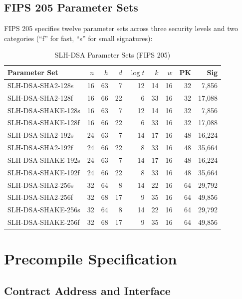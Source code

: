 \documentclass[11pt,a4paper]{article}
\begin{document}
\subsection{FIPS 205 Parameter Sets}

FIPS 205 specifies twelve parameter sets across three security levels and two categories (``f'' for fast, ``s'' for small signatures):

\begin{table}[htbp]
\centering
\caption{SLH-DSA Parameter Sets (FIPS 205)}
\label{tab:params}
\small
\begin{tabular}{@{}lrrrrrrrr@{}}
\toprule
Parameter Set & $n$ & $h$ & $d$ & $\log t$ & $k$ & $w$ & PK & Sig \\
\midrule
SLH-DSA-SHA2-128s & 16 & 63 & 7 & 12 & 14 & 16 & 32 & 7,856 \\
SLH-DSA-SHA2-128f & 16 & 66 & 22 & 6 & 33 & 16 & 32 & 17,088 \\
SLH-DSA-SHAKE-128s & 16 & 63 & 7 & 12 & 14 & 16 & 32 & 7,856 \\
SLH-DSA-SHAKE-128f & 16 & 66 & 22 & 6 & 33 & 16 & 32 & 17,088 \\
SLH-DSA-SHA2-192s & 24 & 63 & 7 & 14 & 17 & 16 & 48 & 16,224 \\
SLH-DSA-SHA2-192f & 24 & 66 & 22 & 8 & 33 & 16 & 48 & 35,664 \\
SLH-DSA-SHAKE-192s & 24 & 63 & 7 & 14 & 17 & 16 & 48 & 16,224 \\
SLH-DSA-SHAKE-192f & 24 & 66 & 22 & 8 & 33 & 16 & 48 & 35,664 \\
SLH-DSA-SHA2-256s & 32 & 64 & 8 & 14 & 22 & 16 & 64 & 29,792 \\
SLH-DSA-SHA2-256f & 32 & 68 & 17 & 9 & 35 & 16 & 64 & 49,856 \\
SLH-DSA-SHAKE-256s & 32 & 64 & 8 & 14 & 22 & 16 & 64 & 29,792 \\
SLH-DSA-SHAKE-256f & 32 & 68 & 17 & 9 & 35 & 16 & 64 & 49,856 \\
\bottomrule
\end{tabular}
\end{table}

\section{Precompile Specification}

\subsection{Contract Address and Interface}
\end{document}
